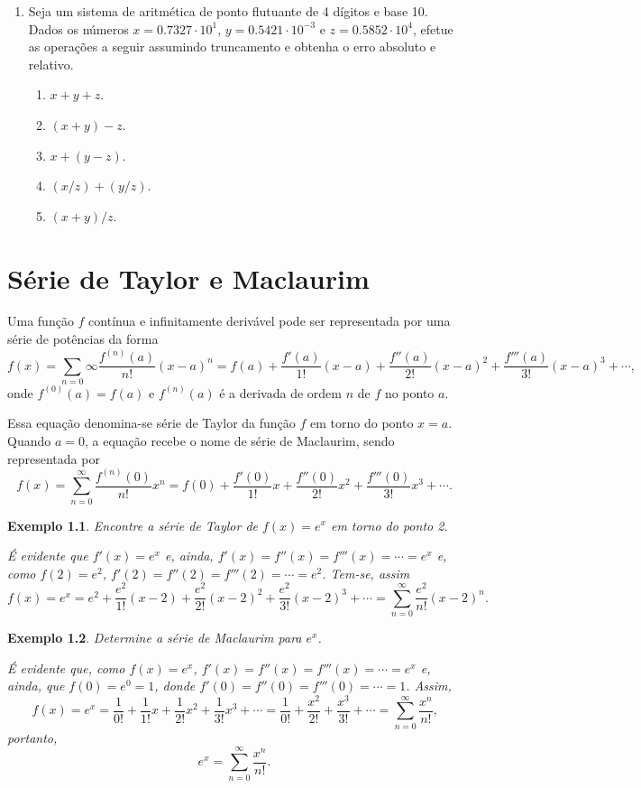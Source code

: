 \documentclass[12pt,a4paper]{book}
\newtheorem{example}{Exemplo}
\begin{document}
\begin{enumerate}
    \item Seja um sistema de aritmética de ponto flutuante de 4 dígitos e base 10. Dados os números $x=0.7327\cdot 10^1$, $y=0.5421\cdot 10^{-3}$ e $z=0.5852\cdot 10^4$, efetue as operações a seguir assumindo truncamento e obtenha o erro absoluto e relativo.
        \begin{enumerate}
            \item $x+y+z$.
            \item $(x+y)-z$.
            \item $x+(y-z)$.
            \item $(x/z)+(y/z)$.
            \item $(x+y)/z$.
        \end{enumerate}
\end{enumerate}

\chapter{Série de Taylor e Maclaurim}

Uma função $f$ contínua e infinitamente derivável pode ser representada por uma série de potências da forma
$$
    f(x)=
        \sum_{n=0}{\infty} \frac{f^{(n)}(a)}{n!} (x-a)^n
    =
        f(a)
        + \frac{f'(a)}{1!}(x-a)
        + \frac{f''(a)}{2!}(x-a)^2
        + \frac{f'''(a)}{3!}(x-a)^3
        +\cdots
        \text{,}
$$
onde $f^{(0)}(a)=f(a)$ e $f^{(n)}(a)$ é a derivada de ordem $n$ de $f$ no ponto $a$.

Essa equação denomina-se série de Taylor da função $f$ em torno do ponto $x=a$. Quando $a=0$, a equação recebe o nome de série de Maclaurim, sendo representada por
$$
    f(x)=
        \sum_{n=0}^{\infty} \frac{f^{(n)}(0)}{n!}x^n
    =
    f(0)
    +\frac{f'(0)}{1!}x
    +\frac{f''(0)}{2!}x^2
    +\frac{f'''(0)}{3!}x^3
    +\cdots
    \text{.}
$$

\begin{example}
    Encontre a série de Taylor de $f(x)=e^x$ em torno do ponto 2.

    É evidente que $f'(x)=e^x$ e, ainda, $f'(x)=f''(x)=f'''(x)=\cdots=e^x$ e, como $f(2)=e^2$, $f'(2)=f''(2)=f'''(2)=\cdots=e^2$. Tem-se, assim
    $$
    f(x)=e^x=
    e^2
    +\frac{e^2}{1!}(x-2)
    +\frac{e^2}{2!}(x-2)^2
    +\frac{e^2}{3!}(x-2)^3
    + \cdots
    = \sum_{n=0}^{\infty} \frac{e^2}{n!}(x-2)^n
    \text{.}
    $$
\end{example}

\begin{example}
    Determine a série de Maclaurim para $e^x$.

    É evidente que, como $f(x)=e^x$, $f'(x)=f''(x)=f'''(x)=\cdots=e^x$ e, ainda, que $f(0)=e^0=1$, donde $f'(0)=f''(0)=f'''(0)=\cdots=1$. Assim,
    $$
        f(x)=e^x=
        \frac{1}{0!}
        +\frac{1}{1!}x
        +\frac{1}{2!}x^2
        +\frac{1}{3!}x^3
        +\cdots
        =
        \frac{1}{0!}
        +\frac{x^2}{2!}
        +\frac{x^3}{3!}
        +\cdots
        =
        \sum_{n=0}^{\infty}\frac{x^n}{n!}
        \text{,}
    $$
    portanto,
    $$
        e^x=\sum_{n=0}^{\infty}\frac{x^n}{n!}
        \text{.}
    $$
\end{example}
\end{document}
